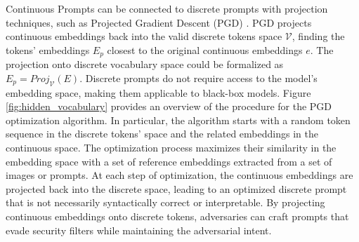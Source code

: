 \documentclass[acmsmall]{acmart}
\begin{document}
Continuous Prompts can be connected to discrete prompts with projection techniques, such as Projected Gradient Descent (PGD) \cite{wen2024hard,hou2022textgrad}. PGD projects continuous embeddings back into the valid discrete tokens space \(\mathcal{V}\), finding the tokens' embeddings $E_{p}$ closest to the original continuous embeddings $e$. The projection onto discrete vocabulary space could be formalized as $E_{p} = \textit{Proj}_{\mathcal{V}}(E)$. Discrete prompts do not require access to the model's embedding space, making them applicable to black-box models. Figure \ref{fig:hidden_vocabulary} provides an overview of the procedure for the PGD optimization algorithm.
In particular, the algorithm starts with a random token sequence in the discrete tokens' space and the related embeddings in the continuous space. The optimization process maximizes their similarity in the embedding space with a set of reference embeddings extracted from a set of images or prompts. At each step of optimization, the continuous embeddings are projected back into the discrete space, leading to an optimized discrete prompt that is not necessarily syntactically correct or interpretable. 
By projecting continuous embeddings onto discrete tokens, adversaries can craft prompts that evade security filters while maintaining the adversarial intent. 
\end{document}
